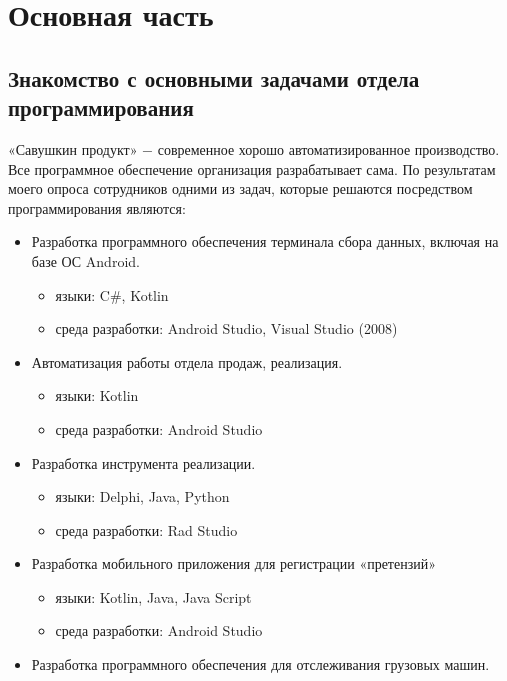 \chapter{Основная часть}
\label{ch:chap1}


\section{Знакомство с основными задачами отдела программирования}

«Савушкин продукт» $-$ современное хорошо автоматизированное производство. Все программное обеспечение организация разрабатывает сама.
По результатам моего опроса сотрудников одними из задач, которые решаются посредством программирования являются:

\begin{itemize}
    \item Разработка программного обеспечения терминала сбора данных, включая на базе ОС Android.
    \begin{itemize}
        \item языки: C#, Kotlin
        \item среда разработки: Android Studio, Visual Studio (2008)
    \end{itemize}
    \item Автоматизация работы отдела продаж, реализация.
    \begin{itemize}
        \item языки: Kotlin
        \item среда разработки: Android Studio
    \end{itemize}
    \item Разработка инструмента реализации.
     \begin {itemize}
     \item языки: Delphi, Java, Python
     \item  среда разработки: Rad Studio
     \end{itemize}
  \item Разработка мобильного приложения для регистрации «претензий»
   \begin{itemize} 
       \item языки:  Kotlin, Java, Java Script
       \item среда разработки: Android Studio
   \end{itemize}
   \item Разработка программного обеспечения для отслеживания грузовых машин.
   \begin{itemize}

\end{itemize}
\end{itemize}
